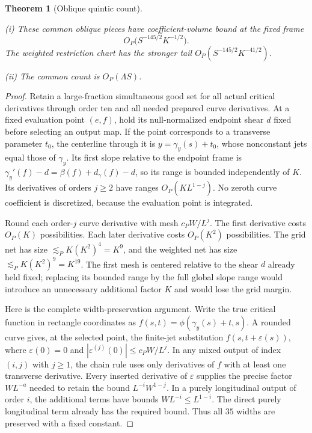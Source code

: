 \documentclass[11pt]{amsart}
\newtheorem{theorem}{Theorem}[section]
\theoremstyle{definition}
\theoremstyle{remark}
\numberwithin{equation}{section}
\begin{document}
\begin{theorem}[Oblique quintic count]\label{low:5:qsc:paid-oblique}

\noindent\textup{(i)} These common oblique pieces have coefficient-volume bound at the fixed frame
\[
 \boxed{\qquad O_P\bigl(S^{-145/2}K^{-1/2}\bigr).\qquad}
\]
The weighted restriction chart has the stronger tail $O_P(S^{-145/2}K^{-41/2})$.

\noindent\textup{(ii)} The common count is $O_P(\Lambda S)$.
\end{theorem}
\begin{proof}
Retain a large-fraction simultaneous good set for all actual critical derivatives through order ten and all needed prepared curve derivatives. At a fixed evaluation point $(e,f)$, hold its null-normalized endpoint shear $d$ fixed before selecting an output map. If the point corresponds to a transverse parameter $t_0$, the centerline through it is $y=\gamma_y(s)+t_0$, whose nonconstant jets equal those of $\gamma_y$. Its first slope relative to the endpoint frame is $\gamma_y'(f)-d=\beta(f)+d_\gamma(f)-d$, so its range is bounded independently of $K$. Its derivatives of orders $j\ge2$ have ranges $O_P(KL^{1-j})$. No zeroth curve coefficient is discretized, because the evaluation point is integrated.

Round each order-$j$ curve derivative with mesh $c_PW/L^j$. The first derivative costs $O_P(K)$ possibilities. Each later derivative costs $O_P(K^2)$ possibilities. The grid net has size $\lesssim_P K(K^2)^4=K^9$, and the weighted net has size $\lesssim_P K(K^2)^9=K^{19}$. The first mesh is centered relative to the shear $d$ already held fixed; replacing its bounded range by the full global slope range would introduce an unnecessary additional factor $K$ and would lose the grid margin.

Here is the complete width-preservation argument. Write the true critical function in rectangle coordinates as $f(s,t)=\phi(\gamma_y(s)+t,s)$. A rounded curve gives, at the selected point, the finite-jet substitution $f(s,t+\varepsilon(s))$, where $\varepsilon(0)=0$ and $|\varepsilon^{(j)}(0)|\le c_PW/L^j$. In any mixed output of index $(i,j)$ with $j\ge1$, the chain rule uses only derivatives of $f$ with at least one transverse derivative. Every inserted derivative of $\varepsilon$ supplies the precise factor $WL^{-a}$ needed to retain the bound $L^{-i}W^{1-j}$. In a purely longitudinal output of order $i$, the additional terms have bounds $WL^{-i}\le L^{1-i}$. The direct purely longitudinal term already has the required bound. Thus all $35$ widths are preserved with a fixed constant. 


\end{proof}
\end{document}
